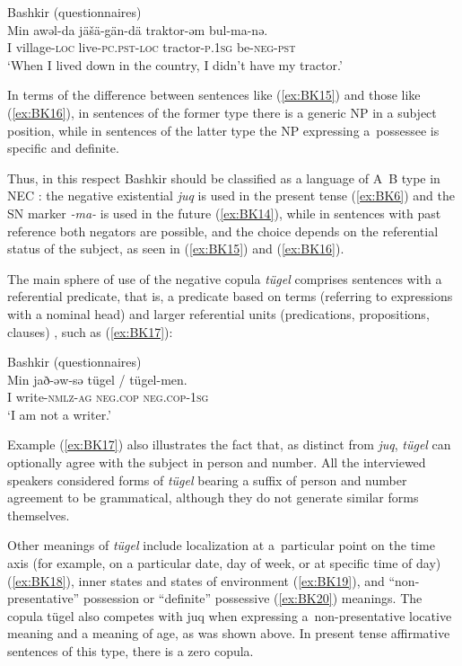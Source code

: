 \documentclass[output=paper]{langsci/langscibook}
\begin{document}
\ea Bashkir (questionnaires) \label{ex:BK16}\\
    \gll Min	awǝl-da		jäšä-gän-dä		traktor-ǝm  bul-ma-nǝ.\\
    I		village-\textsc{loc}	live-\textsc{pc.pst-loc}	tractor-\textsc{p.1sg} be-\textsc{neg-pst}\\
	\glt `When I lived down in the country, I didn’t have my tractor.'
\z


In terms of the difference between sentences like (\ref{ex:BK15}) and those like (\ref{ex:BK16}), in sentences of the former type there is a generic NP in a subject position, while in sentences of the latter type the NP expressing a possessee is specific and definite.

Thus, in this respect Bashkir should be classified as a language of A~B type in NEC \citep{Veselinova2016}: the negative existential \textit{juq} is used in the present tense (\ref{ex:BK6}) and the SN marker \textit{-ma-} is used in the future (\ref{ex:BK14}), while in sentences with past reference both negators are possible, and the choice depends on the referential status of the subject, as seen in (\ref{ex:BK15}) and (\ref{ex:BK16}).

The main sphere of use of the negative copula \textit{tügel} comprises sentences with a referential predicate, that is, a predicate based on terms (referring to expressions with a nominal head) and larger referential units (predications, propositions, clauses) \citep[77–91]{hengeveld1992a}, such as (\ref{ex:BK17}):

\ea Bashkir (questionnaires) \label{ex:BK17}\\
	\gll Min	jað-əw-sə			tügel			{/ tügel-men.}\\
	I		write-\textsc{nmlz-ag}	\textsc{neg.cop}		\textsc{neg.cop-1sg}\\
	\glt `I am not a writer.'
\z

Example (\ref{ex:BK17}) also illustrates the fact that, as distinct from \textit{juq}, \textit{tügel} can optionally agree with the subject in person and number. All the interviewed speakers considered forms of \textit{tügel} bearing a suffix of person and number agreement to be grammatical, although they do not generate similar forms themselves.

Other meanings of \textit{tügel} include localization at a particular point on the time axis (for example, on a particular date, day of week, or at specific time of day) (\ref{ex:BK18}), inner states and states of environment (\ref{ex:BK19}), and “non-presentative” possession \citep{hengeveld1992a} or “definite” possessive \citep{stassen2009a} (\ref{ex:BK20}) meanings. The copula tügel also competes with juq when expressing a non-presentative locative meaning and a meaning of age, as was shown above. In present tense affirmative sentences of this type, there is a zero copula.
\end{document}
